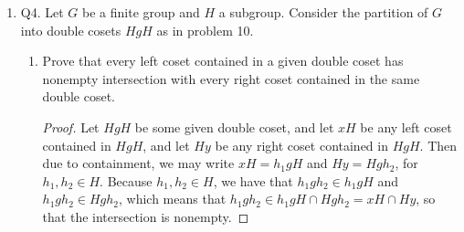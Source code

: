 \documentclass[11pt]{article}
\newcommand{\cbr}[1]{\left\{#1\right\}}
\DeclareMathOperator{\Orb}{Orb}
\begin{document}
\begin{enumerate}
\begin{enumerate}[label=\textbf{(\alph*)}]
\begin{proof}
            Hence $\abs{HxK}/\abs{K} = n = \abs{\Orb(xK)}$, so by the Orbit-Stabilizer Theorem, we have that \[\abs{HxK}/\abs{K} = \abs{H\colon H_{xK}} = \abs{H\colon H\cap xKx^{-1}},\]
            which implies that $\abs{HxK} = \abs{K}\cdot \abs{H\colon H\cap xKx^{-1}}$.
        \end{proof}
        \item Prove that $\abs{HxK} = \abs{H}\cdot \abs{K\colon K\cap x^{-1}Hx}$.
        \begin{proof}
            Similarly, consider the action of $K$ acting by right multiplication on the set of right cosets of $H$.
            Observe that the stabilizer $K_{Hx}$ equals $K\cap x^{-1}Hx$ because for $k\in K_{Hx}$,
            \[Hx \cdot k = Hxk = Hx\]
            implies that $xkx^{-1} = H$, so that $k\in x^{-1}Hx$. With $k\in K$, we have that $K_{Hx} = k\cap x^{-1}Hx$.

            From part \textbf{(b)}, the orbit containing $Hx$ of $K$ was $\Orb(Hx) = \cbr{Hx_1,\dots,Hx_n}$ (disjoint cosets), so $\abs{\Orb(Hx)} = n$. We also had that $HxK = \cup_{i=1}^n~ Hx_i$, and because each $Hx_i$ is disjoint and has the same cardinality as $H$, $\abs{HxK} = \abs{\cup_{i=1}^n~ Hx_i} = n\abs{H}$.

            Hence $\abs{HxK}/\abs{H} = n = \abs{\Orb(Hx)}$, so by the Orbit-Stabilizer Theorem, we have that 
            \[\abs{HxK}/\abs{H} = \abs{K\colon K_{Hx}} = \abs{K\colon k\cap x^{-1}Hx},\]
            which implies that $\abs{HxK} = \abs{H}\cdot \abs{K\colon K\cap x^{-1}Hx}$.
        \end{proof}
    \end{enumerate}
    \item Q4. Let $G$ be a finite group and $H$ a subgroup. Consider the partition of $G$ into double cosets $HgH$  as in problem 10.
    \begin{enumerate}[label=\textbf{(\alph*)}]
        \item Prove that every left coset contained in a given double coset has nonempty intersection with every right coset contained in the same double coset.
        \begin{proof}
            Let $HgH$ be some given double coset, and let $xH$ be any left coset contained in $HgH$, and let $Hy$ be any right coset contained in $HgH$. Then due to containment, we may write $xH = h_1gH$ and $Hy = Hgh_2$, for $h_1,h_2\in H$. Because $h_1,h_2\in H$, we have that $h_1gh_2\in h_1gH$ and $h_1gh_2\in Hgh_2$, which means that $h_1gh_2\in h_1gH\cap Hgh_2 = xH\cap Hy$, so that the intersection is nonempty.


\end{proof}
\end{enumerate}
\end{enumerate}
\end{document}
